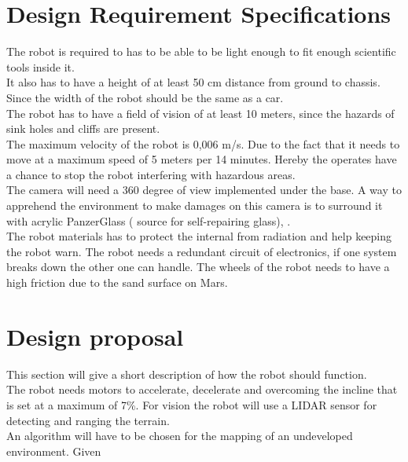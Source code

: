 \section{Design Requirement Specifications} \label{ch:Designrequiremnts}

The robot is required to has to be able to be light enough to fit enough scientific tools inside it.\\ 
It also has to have a height of at least 50 cm distance from ground to chassis. Since the width of the robot should be the same as a car.\\ 
The robot has to have a field of vision of at least 10 meters, since the hazards of sink holes and cliffs are present.\\
The maximum velocity of the robot is 0,006 m/s. Due to the fact that it needs to move at a maximum speed of 5 meters per 14 minutes. Hereby the operates have a chance to stop the robot interfering with hazardous areas.\\
The camera will need a 360 degree of view implemented under the base. A way to apprehend the environment to make damages on this camera is to surround it with acrylic PanzerGlass ( source for self-repairing glass), \cite{Lidar360}.\\ 
The robot materials has to protect the internal from radiation and help keeping the robot warn. 
The robot needs a redundant circuit of electronics, if one system breaks down the other one can handle.
The wheels of the robot needs to have a high friction due to the sand surface on Mars\cite{sand}.

\section{Design proposal}\label{ch:Designproposal}

This section will give a short description of how the robot should function.\\
The robot needs motors to accelerate, decelerate and overcoming the incline that is set at a maximum of 7\%. For vision the robot will use a LIDAR sensor for detecting and ranging the terrain.\\

An algorithm will have to be chosen for the mapping of an undeveloped environment. Given 